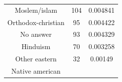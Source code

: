\documentclass[]{tufte-book}
\begin{document}
\begin{longtable}[]{@{}ccc@{}}
\begin{minipage}[t]{0.33\columnwidth}
Moslem/islam\strut
\end{minipage} & \begin{minipage}[t]{0.15\columnwidth}\centering\strut
104\strut
\end{minipage} & \begin{minipage}[t]{0.25\columnwidth}\centering\strut
0.004841\strut
\end{minipage}\tabularnewline
\begin{minipage}[t]{0.33\columnwidth}\centering\strut
Orthodox-christian\strut
\end{minipage} & \begin{minipage}[t]{0.15\columnwidth}\centering\strut
95\strut
\end{minipage} & \begin{minipage}[t]{0.25\columnwidth}\centering\strut
0.004422\strut
\end{minipage}\tabularnewline
\begin{minipage}[t]{0.33\columnwidth}\centering\strut
No answer\strut
\end{minipage} & \begin{minipage}[t]{0.15\columnwidth}\centering\strut
93\strut
\end{minipage} & \begin{minipage}[t]{0.25\columnwidth}\centering\strut
0.004329\strut
\end{minipage}\tabularnewline
\begin{minipage}[t]{0.33\columnwidth}\centering\strut
Hinduism\strut
\end{minipage} & \begin{minipage}[t]{0.15\columnwidth}\centering\strut
70\strut
\end{minipage} & \begin{minipage}[t]{0.25\columnwidth}\centering\strut
0.003258\strut
\end{minipage}\tabularnewline
\begin{minipage}[t]{0.33\columnwidth}\centering\strut
Other eastern\strut
\end{minipage} & \begin{minipage}[t]{0.15\columnwidth}\centering\strut
32\strut
\end{minipage} & \begin{minipage}[t]{0.25\columnwidth}\centering\strut
0.00149\strut
\end{minipage}\tabularnewline
\begin{minipage}[t]{0.33\columnwidth}\centering\strut
Native american\strut
\end{minipage} & \begin{minipage}[t]{0.15\columnwidth}\centering\strut

\end{minipage}
\end{longtable}
\end{document}
